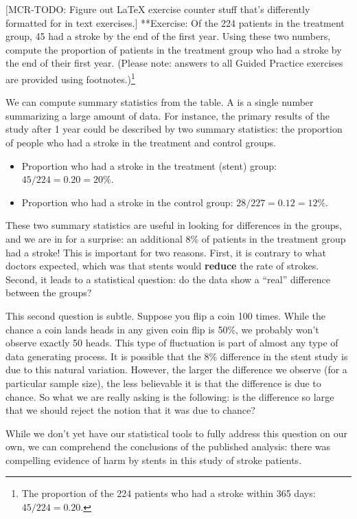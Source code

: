 \documentclass[]{book}
\providecommand{\tightlist}{%
  \setlength{\itemsep}{0pt}\setlength{\parskip}{0pt}}
\begin{document}
{[}MCR-TODO: Figure out LaTeX exercise counter stuff that's differently formatted for in text exercises.{]}
**Exercise: Of the 224 patients in the treatment group, 45 had a stroke by the end of the first year. Using these two numbers, compute the proportion of patients in the treatment group who had a stroke by the end of their first year. (Please note: answers to all Guided Practice exercises are provided using footnotes.)\footnote{The proportion of the 224 patients who had a stroke within 365 days: \(45/224 = 0.20\).}

We can compute summary statistics from the table.
A  is a single number summarizing a large amount of data.
For instance, the primary results of the study after 1 year could be described by two summary statistics: the proportion of people who had a stroke in the treatment and control groups.

\begin{itemize}
\tightlist
\item
  Proportion who had a stroke in the treatment (stent) group: \(45/224 = 0.20 = 20\%\).
\item
  Proportion who had a stroke in the control group: \(28/227 = 0.12 = 12\%\).
\end{itemize}

These two summary statistics are useful in looking for differences in the groups, and we are in for a surprise: an additional 8\% of patients in the treatment group had a stroke!
This is important for two reasons.
First, it is contrary to what doctors expected, which was that stents would \textbf{reduce} the rate of strokes.
Second, it leads to a statistical question: do the data show a ``real'' difference between the groups?

This second question is subtle.
Suppose you flip a coin 100 times. While the chance a coin lands heads in any given coin flip is 50\%, we probably won't observe exactly 50 heads.
This type of fluctuation is part of almost any type of data generating process.
It is possible that the 8\% difference in the stent study is due to this natural variation.
However, the larger the difference we observe (for a particular sample size), the less believable it is that the difference is due to chance.
So what we are really asking is the following: is the difference so large that we should reject the notion that it was due to chance?

While we don't yet have our statistical tools to fully address this question on our own, we can comprehend the conclusions of the published analysis: there was compelling evidence of harm by stents in this study of stroke patients.
\end{document}
